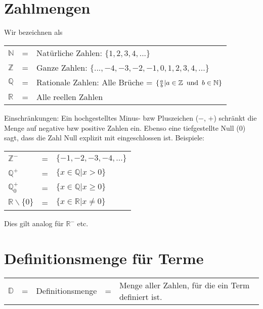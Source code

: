 



\usepackage{amssymb} %
\renewcommand{\metaHeaderLine}{Theorieblatt}
\renewcommand{\arbeitsblattTitel}{Mengenbezeichnungen}

\arbeitsblattHeader{}

\section{Zahlmengen}
Wir bezeichnen als

\begin{tabular}{lcl}
  $\mathbb{N}$ &=& Natürliche Zahlen: $\{1, 2, 3, 4, ...\}$ \\
  $\mathbb{Z}$ &=& Ganze Zahlen: $\{..., -4, -3, -2, -1, 0, 1, 2, 3, 4, ...\}$ \\
  $\mathbb{Q}$ &=& Rationale Zahlen: Alle Brüche = $\{\frac{a}{b} |
  a\in\mathbb{Z}\textrm{\, und\, } b\in\mathbb{N}\}$ \\
  $\mathbb{R}$ &=& Alle reellen Zahlen\\
\end{tabular}

Einschränkungen: Ein hochgestelltes Minus- bzw Pluszeichen ($-$, $+$)
schränkt die Menge auf negative bzw positive Zahlen ein. Ebenso eine
tiefgestellte Null ($0$) sagt, dass die Zahl Null explizit mit
eingeschlossen ist. Beispiele:

\begin{tabular}{lcl}
  $\mathbb{Z}^{-}$ &=& $\{-1, -2, -3, -4, ...\}$ \\
  $\mathbb{Q}^{+}$ &=& $\{x\in \mathbb{Q} | x > 0\}$ \\
  $\mathbb{Q}^{+}_0$ &=& $\{x\in \mathbb{Q} | x \ge 0\}$ \\
  $\mathbb{R}\backslash{}\{0\}$ &=& $\{x\in \mathbb{R} | x \ne 0\}$ \\
\end{tabular}

Dies gilt analog für $\mathbb{R}^{-}$ etc.

\section{Definitionsmenge für Terme}

\begin{tabular}{lclcp{10cm}}
  $\mathbb{D}$ &=& Definitionsmenge &=& Menge aller Zahlen, für die ein Term definiert ist.\\
\end{tabular}

